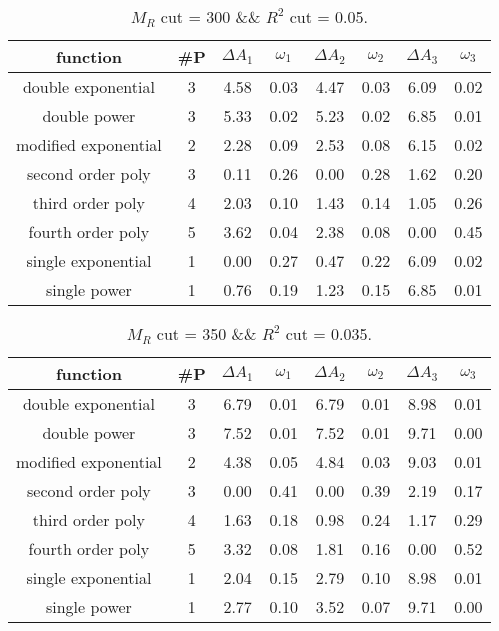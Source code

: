  
\begin{table}[H] 
\begin{center} 
\begin{tabular}{|c|c|cc|cc|cc|} 
\hline function & \#P & $\Delta A_1$ & $\omega_1$ & $\Delta A_2$ & $\omega_2$ & $\Delta A_3$ & $\omega_3$ \\ \hline 
double exponential &  3 &   4.58 &   0.03 &   4.47 &   0.03 &   6.09 &   0.02 \\ 
double power &  3 &   5.33 &   0.02 &   5.23 &   0.02 &   6.85 &   0.01 \\ 
modified exponential &  2 &   2.28 &   0.09 &   2.53 &   0.08 &   6.15 &   0.02 \\ 
second order poly &  3 &   0.11 &   0.26 &   0.00 &   0.28 &   1.62 &   0.20 \\ 
third order poly &  4 &   2.03 &   0.10 &   1.43 &   0.14 &   1.05 &   0.26 \\ 
fourth order poly &  5 &   3.62 &   0.04 &   2.38 &   0.08 &   0.00 &   0.45 \\ 
single exponential &  1 &   0.00 &   0.27 &   0.47 &   0.22 &   6.09 &   0.02 \\ 
single power &  1 &   0.76 &   0.19 &   1.23 &   0.15 &   6.85 &   0.01 \\ 
\hline 
\end{tabular} 
\caption{$M_R$ cut = 300 \&\& $R^2$ cut = 0.05.} 
\label{tab:FitChoices_300_0.05} 
\end{center} 
\end{table} 
 
 
\begin{table}[H] 
\begin{center} 
\begin{tabular}{|c|c|cc|cc|cc|} 
\hline function & \#P & $\Delta A_1$ & $\omega_1$ & $\Delta A_2$ & $\omega_2$ & $\Delta A_3$ & $\omega_3$ \\ \hline 
double exponential &  3 &   6.79 &   0.01 &   6.79 &   0.01 &   8.98 &   0.01 \\ 
double power &  3 &   7.52 &   0.01 &   7.52 &   0.01 &   9.71 &   0.00 \\ 
modified exponential &  2 &   4.38 &   0.05 &   4.84 &   0.03 &   9.03 &   0.01 \\ 
second order poly &  3 &   0.00 &   0.41 &   0.00 &   0.39 &   2.19 &   0.17 \\ 
third order poly &  4 &   1.63 &   0.18 &   0.98 &   0.24 &   1.17 &   0.29 \\ 
fourth order poly &  5 &   3.32 &   0.08 &   1.81 &   0.16 &   0.00 &   0.52 \\ 
single exponential &  1 &   2.04 &   0.15 &   2.79 &   0.10 &   8.98 &   0.01 \\ 
single power &  1 &   2.77 &   0.10 &   3.52 &   0.07 &   9.71 &   0.00 \\ 
\hline 
\end{tabular} 
\caption{$M_R$ cut = 350 \&\& $R^2$ cut = 0.035.} 
\label{tab:FitChoices_350_0.035} 
\end{center} 
\end{table} 
 
 
